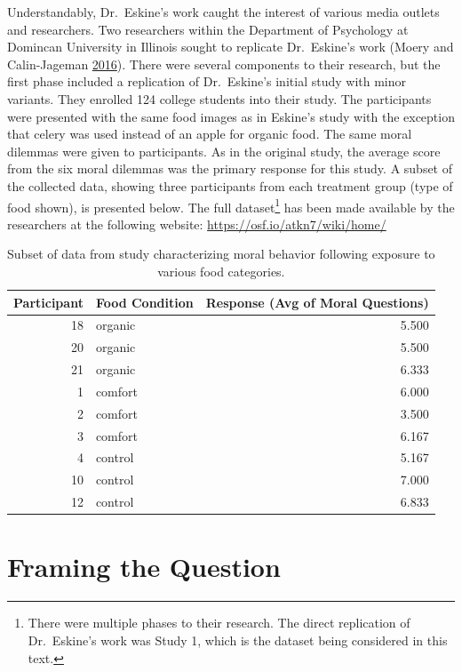\documentclass[]{book}
\let\rmarkdownfootnote\footnote%
\def\footnote{\protect\rmarkdownfootnote}
\theoremstyle{definition}
\theoremstyle{definition}
\theoremstyle{remark}
\begin{document}
Understandably, Dr.~Eskine's work caught the interest of various media
outlets and researchers. Two researchers within the Department of
Psychology at Domincan University in Illinois sought to replicate
Dr.~Eskine's work (Moery and Calin-Jageman
\protect\hyperlink{ref-Moery2016}{2016}). There were several components
to their research, but the first phase included a replication of
Dr.~Eskine's initial study with minor variants. They enrolled 124
college students into their study. The participants were presented with
the same food images as in Eskine's study with the exception that celery
was used instead of an apple for organic food. The same moral dilemmas
were given to participants. As in the original study, the average score
from the six moral dilemmas was the primary response for this study. A
subset of the collected data, showing three participants from each
treatment group (type of food shown), is presented below. The full
dataset\footnote{There were multiple phases to their research. The
  direct replication of Dr.~Eskine's work was Study 1, which is the
  dataset being considered in this text.} has been made available by the
researchers at the following website:
\url{https://osf.io/atkn7/wiki/home/}

\begin{table}

\caption{\label{tab:caseorganic-table}Subset of data from study characterizing moral behavior following exposure to various food categories.}
\centering
\begin{tabular}[t]{r|l|r}
\hline
Participant & Food Condition & Response (Avg of Moral Questions)\\
\hline
18 & organic & 5.500\\
\hline
20 & organic & 5.500\\
\hline
21 & organic & 6.333\\
\hline
1 & comfort & 6.000\\
\hline
2 & comfort & 3.500\\
\hline
3 & comfort & 6.167\\
\hline
4 & control & 5.167\\
\hline
10 & control & 7.000\\
\hline
12 & control & 6.833\\
\hline
\end{tabular}
\end{table}

\chapter{Framing the Question}\label{ANOVAquestions}
\end{document}
